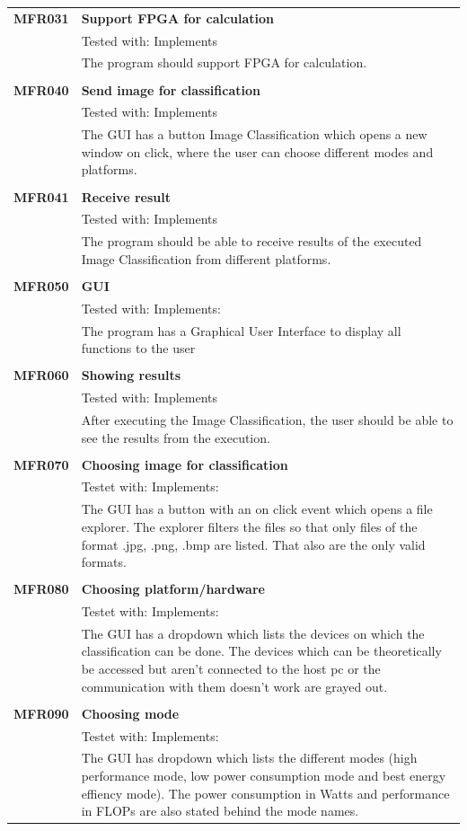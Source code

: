 \documentclass[parskip=full]{scrartcl}
\begin{document}
\begin{tabular}{p{2cm}p{12cm}}
\textbf {MFR031} & \textbf{Support FPGA for calculation} \\
& Tested with: Implements \\
& The program should support FPGA for calculation. \\
& \\
\textbf {MFR040} & \textbf{Send image for classification} \\
& Tested with: Implements \\
& The GUI has a button Image Classification which opens a new window on click, where the user can choose different modes and platforms. \\
& \\
\textbf {MFR041} & \textbf{Receive result} \\
& Tested with: Implements \\
& The program should be able to receive results of the executed Image Classification from different platforms. \\
& \\
\textbf {MFR050} & \textbf{GUI} \\
& Tested with: Implements: \\
& The program has a Graphical User Interface to display all functions to the user \\
& \\
\textbf {MFR060} & \textbf{Showing results} \\
& Tested with: Implements\\
& After executing the Image Classification, the user should be able to see the results from the execution. \\
& \\
\textbf{MFR070} & \textbf{Choosing image for classification}\\
& Testet with: Implements: \\
& The GUI has a button with an on click event which opens a file explorer. The explorer filters the files so that only files of the format .jpg, .png, .bmp are listed. That also are the only valid formats.\\
& \\
\textbf{MFR080} & \textbf{Choosing platform/hardware}\\
& Testet with: Implements: \\
& The GUI has a dropdown which lists the devices on which the classification can be done. The devices which can be theoretically be accessed but aren't connected to the host pc or the communication with them doesn't work are grayed out. \\
& \\
\textbf{MFR090} & \textbf{Choosing mode}\\
& Testet with: Implements: \\
& The GUI has dropdown which lists the different modes (high performance mode, low power consumption mode and best energy effiency mode). The power consumption in Watts and performance in FLOPs are also stated behind the mode names.
\end{tabular}
\end{document}
